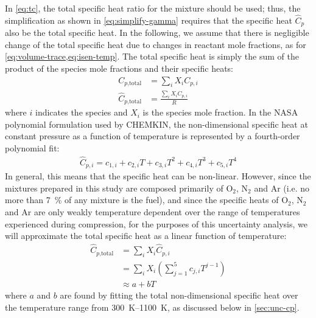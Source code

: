 \documentclass[../main.tex]{subfiles}
\begin{document}
In \cref{eq:tc}, the total specific heat ratio for the mixture
should be used; thus, the simplification as shown in \cref{eq:simplify-gamma}
requires that the specific heat $\hat{C}_p$ also be the total specific
heat. In the following, we assume that there is negligible
change of the total specific heat due to changes in reactant
mole fractions, as for \cref{eq:volume-trace,eq:isen-temp}.
The total specific heat is simply the sum of the product of
the species mole fractions and their specific heats:
%
\begin{subequations}
\label{eq:cp}
\begin{align}
C_{p\text{,total}} &= \sum_i X_i C_{p,i} \\
\hat{C}_{p\text{,total}} &= \frac{\sum_i X_i C_{p,i}}{R}
\end{align}
\end{subequations}
%
where $i$ indicates the species and $X_i$ is the species mole fraction.
In the NASA polynomial formulation used by CHEMKIN, the non-dimensional specific
heat at constant pressure as a function of temperature is represented by a
fourth-order polynomial fit:
%
\begin{align}
\label{eq:cp-nasa}
\hat{C}_{p,i} = c_{1,i} + c_{2,i} T + c_{3,i} T^2 + c_{4,i} T^3 + c_{5,i} T^4
\end{align}
%
In general, this means that the specific heat can be non-linear. However,
since the mixtures prepared in this study are composed primarily of
O$_2$, N$_2$ and Ar (i.e. no more than \SI{7}{\percent} of any mixture is the
fuel), and since the specific heats of O$_2$, N$_2$ and Ar are only weakly
temperature dependent over the range of temperatures experienced during
compression, for the purposes of this uncertainty analysis, we will
approximate the total specific heat as a linear function of temperature:
%
\begin{equation}
\label{eq:cp-total}
\begin{split}
\hat{C}_{p\text{,total}} &= \sum_i X_i \hat{C}_{p,i} \\
&= \sum_i X_i \left( \sum_{j=1}^5 c_{j,i} T^{j-1} \right) \\
&\approx a + b T
\end{split}
\end{equation}
%
where $a$ and $b$ are found by fitting the total non-dimensional specific heat
over the temperature range from \SIrange{300}{1100}{\kelvin}, as
discussed below in \cref{sec:unc-cp}.
\end{document}
